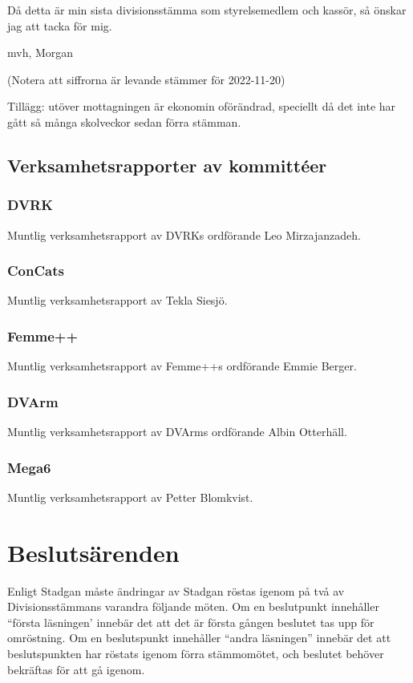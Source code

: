 \documentclass[protokoll]{dvd}
\begin{document}
Då detta är min sista divisionsstämma som styrelsemedlem och kassör, så önskar jag att tacka för mig.

mvh, Morgan

(Notera att siffrorna är levande stämmer för 2022-11-20)

Tillägg: utöver mottagningen är ekonomin oförändrad, speciellt då det inte har gått så många skolveckor sedan förra stämman.

\newpage

\subsection{Verksamhetsrapporter av kommittéer}

\subsubsection*{DVRK}
Muntlig verksamhetsrapport av DVRKs ordförande Leo Mirzajanzadeh.

\subsubsection*{ConCats}
Muntlig verksamhetsrapport av Tekla Siesjö.

\subsubsection*{Femme++}
Muntlig verksamhetsrapport av Femme++s ordförande Emmie Berger.

\subsubsection*{DVArm}
Muntlig verksamhetsrapport av DVArms ordförande Albin Otterhäll.

\subsubsection*{Mega6}
Muntlig verksamhetsrapport av Petter Blomkvist.

\newpage

\section{Beslutsärenden}

Enligt Stadgan måste ändringar av Stadgan röstas igenom på två av Divisionsstämmans varandra följande möten.
Om en beslutpunkt innehåller ``första läsningen' innebär det att det är första gången beslutet tas upp för omröstning.
Om en beslutspunkt innehåller ``andra läsningen'' innebär det att beslutspunkten har röstats igenom förra stämmomötet, och beslutet behöver bekräftas för att gå igenom.
\end{document}
